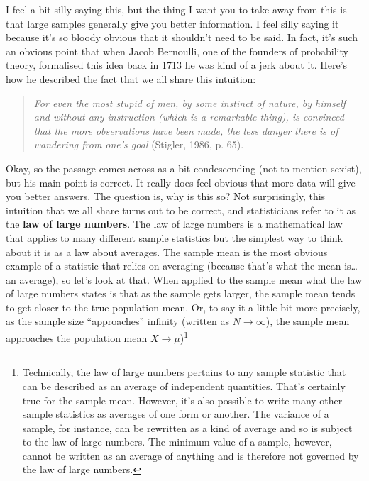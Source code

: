 \documentclass[
  a4paper,
]{book}
\begin{document}
I feel a bit silly saying this, but the thing I want you to take away
from this is that large samples generally give you better information. I
feel silly saying it because it's so bloody obvious that it shouldn't
need to be said. In fact, it's such an obvious point that when Jacob
Bernoulli, one of the founders of probability theory, formalised this
idea back in 1713 he was kind of a jerk about it. Here's how he
described the fact that we all share this intuition:

\begin{quote}
\emph{For even the most stupid of men, by some instinct of nature, by
himself and without any instruction (which is a remarkable thing), is
convinced that the more observations have been made, the less danger
there is of wandering from one's goal} (Stigler, 1986, p. 65).
\end{quote}

Okay, so the passage comes across as a bit condescending (not to mention
sexist), but his main point is correct. It really does feel obvious that
more data will give you better answers. The question is, why is this so?
Not surprisingly, this intuition that we all share turns out to be
correct, and statisticians refer to it as the \textbf{law of large
numbers}. The law of large numbers is a mathematical law that applies to
many different sample statistics but the simplest way to think about it
is as a law about averages. The sample mean is the most obvious example
of a statistic that relies on averaging (because that's what the mean
is\ldots{} an average), so let's look at that. When applied to the
sample mean what the law of large numbers states is that as the sample
gets larger, the sample mean tends to get closer to the true population
mean. Or, to say it a little bit more precisely, as the sample size
``approaches'' infinity (written as \(N \longrightarrow \infty\)), the
sample mean approaches the population mean
\(\bar{X} \longrightarrow \mu\))\footnote{Technically, the law of large
  numbers pertains to any sample statistic that can be described as an
  average of independent quantities. That's certainly true for the
  sample mean. However, it's also possible to write many other sample
  statistics as averages of one form or another. The variance of a
  sample, for instance, can be rewritten as a kind of average and so is
  subject to the law of large numbers. The minimum value of a sample,
  however, cannot be written as an average of anything and is therefore
  not governed by the law of large numbers.}
\end{document}
